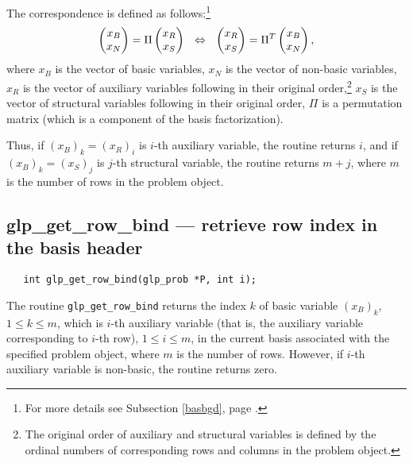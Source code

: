 \def\arraystretch{1}

The correspondence is defined as follows:\footnote{For more details see
Subsection \ref{basbgd}, page \pageref{basbgd}.}
$$\left(\begin{array}{@{}c@{}}x_B\\x_N\\\end{array}\right)=
\Pi\left(\begin{array}{@{}c@{}}x_R\\x_S\\\end{array}\right)
\ \ \Leftrightarrow
\ \ \left(\begin{array}{@{}c@{}}x_R\\x_S\\\end{array}\right)=
\Pi^T\left(\begin{array}{@{}c@{}}x_B\\x_N\\\end{array}\right),$$
where $x_B$ is the vector of basic variables, $x_N$ is the vector of
non-basic variables, $x_R$ is the vector of auxiliary variables
following in their original order,\footnote{The original order of
auxiliary and structural variables is defined by the ordinal numbers
of corresponding rows and columns in the problem object.} $x_S$ is the
vector of structural variables following in their original order, $\Pi$
is a permutation matrix (which is a component of the basis
factorization).

Thus, if $(x_B)_k=(x_R)_i$ is $i$-th auxiliary variable, the routine
returns $i$, and if $(x_B)_k=(x_S)_j$ is $j$-th structural variable,
the routine returns $m+j$, where $m$ is the number of rows in the
problem object.

\subsection{glp\_get\_row\_bind --- retrieve row index in the basis
header}

\synopsis

\begin{verbatim}
   int glp_get_row_bind(glp_prob *P, int i);
\end{verbatim}

\returns

The routine \verb|glp_get_row_bind| returns the index $k$ of basic
variable $(x_B)_k$, $1\leq k\leq m$, which is $i$-th auxiliary variable
(that is, the auxiliary variable corresponding to $i$-th row),
$1\leq i\leq m$, in the current basis associated with the specified
problem object, where $m$ is the number of rows. However, if $i$-th
auxiliary variable is non-basic, the routine returns zero.


